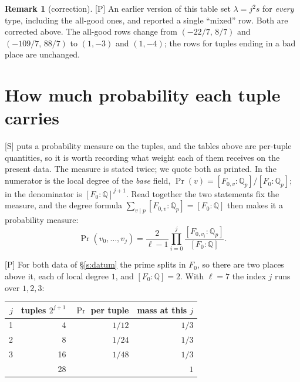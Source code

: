 \documentclass[11pt]{article}
\theoremstyle{plain}
\theoremstyle{definition}
\newtheorem{remark}{Remark}
\begin{document}
\begin{remark}[correction]\label{r:lambda}
\textup{[P]} An earlier version of this table set $\lambda=j^{2}s$ for \emph{every}
type, including the all-good ones, and reported a single ``mixed'' row.  Both are
corrected above.  The all-good rows change from $(-22/7,\,8/7)$ and $(-109/7,\,88/7)$ to
$(1,-3)$ and $(1,-4)$; the rows for tuples ending in a bad place are unchanged.
\end{remark}

\section{How much probability each tuple carries}\label{s:prob}

\textup{[S]} \cite{DHPS} puts a probability measure on the tuples, and the tables
above are per-tuple quantities, so it is worth recording what weight each of them
receives on the present data.  The measure is stated twice; we quote both as printed.  In \cite[\S1,
p.~2]{DHPS} the numerator is the local degree of the \emph{base} field,
$\Pr(v)=[F_{0,v}:\mathbb{Q}_p]/[F_0:\mathbb{Q}_p]$; in \cite[\S7.1,
p.~22]{DHPS} the denominator is $[F_0:\mathbb{Q}]^{j+1}$.  Read together the two
statements fix the measure, and the degree formula
$\sum_{v\mid p}[F_{0,v}:\mathbb{Q}_p]=[F_0:\mathbb{Q}]$ then makes it a probability
measure:
\[
  \Pr(v_0,\dots,v_j)=\frac{2}{\ell-1}\prod_{i=0}^{j}
  \frac{[F_{0,v_i}:\mathbb{Q}_p]}{[F_0:\mathbb{Q}]}.
\]

\textup{[P]} For both data of \S\ref{s:datum} the prime splits in $F_0$, so there
are two places above it, each of local degree $1$, and $[F_0:\mathbb{Q}]=2$.  With
$\ell=7$ the index $j$ runs over $1,2,3$:

\begin{center}
\begin{tabular}{rrrr}
\toprule
$j$ & tuples $2^{j+1}$ & $\Pr$ per tuple & mass at this $j$\\
\midrule
1 & 4  & $1/12$ & $1/3$\\
2 & 8  & $1/24$ & $1/3$\\
3 & 16 & $1/48$ & $1/3$\\
\midrule
 & 28 & & $1$\\
\bottomrule
\end{tabular}
\end{center}
\end{document}
